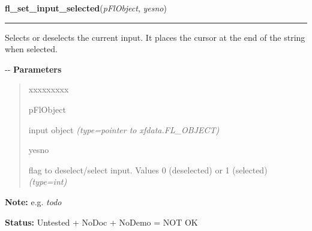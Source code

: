 \hspace{.8\funcindent}\begin{boxedminipage}{\funcwidth}

    \raggedright \textbf{fl\_set\_input\_selected}(\textit{pFlObject}, \textit{yesno})

    \vspace{-1.5ex}

    \rule{\textwidth}{0.5\fboxrule}
\setlength{\parskip}{2ex}

Selects or deselects the current input. It places the cursor at
the end of the string when selected.

-{}-
\setlength{\parskip}{1ex}
      \textbf{Parameters}
      \vspace{-1ex}

      \begin{quote}
        \begin{Ventry}{xxxxxxxxx}

          \item[pFlObject]


input object
            {\it (type=pointer to xfdata.FL\_OBJECT)}

          \item[yesno]


flag to deselect/select input. Values 0 (deselected) or 1 (selected)
            {\it (type=int)}

        \end{Ventry}

      \end{quote}

\textbf{Note:} 
e.g. \emph{todo}


\textbf{Status:} 
Untested + NoDoc + NoDemo = NOT OK


    \end{boxedminipage}

    \label{xformslib:flinput:fl_set_input_selected_range}

    \vspace{0.5ex}

